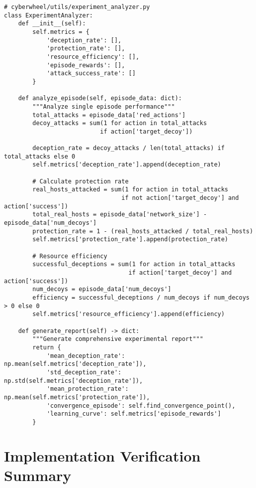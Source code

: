 \documentclass[12pt,a4paper]{article}
\begin{document}
\begin{lstlisting}[caption=Experimental Analysis Implementation]
# cyberwheel/utils/experiment_analyzer.py
class ExperimentAnalyzer:
    def __init__(self):
        self.metrics = {
            'deception_rate': [],
            'protection_rate': [],
            'resource_efficiency': [],
            'episode_rewards': [],
            'attack_success_rate': []
        }
    
    def analyze_episode(self, episode_data: dict):
        """Analyze single episode performance"""
        total_attacks = episode_data['red_actions']
        decoy_attacks = sum(1 for action in total_attacks 
                           if action['target_decoy'])
        
        deception_rate = decoy_attacks / len(total_attacks) if total_attacks else 0
        self.metrics['deception_rate'].append(deception_rate)
        
        # Calculate protection rate
        real_hosts_attacked = sum(1 for action in total_attacks 
                                 if not action['target_decoy'] and action['success'])
        total_real_hosts = episode_data['network_size'] - episode_data['num_decoys']
        protection_rate = 1 - (real_hosts_attacked / total_real_hosts)
        self.metrics['protection_rate'].append(protection_rate)
        
        # Resource efficiency
        successful_deceptions = sum(1 for action in total_attacks 
                                   if action['target_decoy'] and action['success'])
        num_decoys = episode_data['num_decoys']
        efficiency = successful_deceptions / num_decoys if num_decoys > 0 else 0
        self.metrics['resource_efficiency'].append(efficiency)
    
    def generate_report(self) -> dict:
        """Generate comprehensive experimental report"""
        return {
            'mean_deception_rate': np.mean(self.metrics['deception_rate']),
            'std_deception_rate': np.std(self.metrics['deception_rate']),
            'mean_protection_rate': np.mean(self.metrics['protection_rate']),
            'convergence_episode': self.find_convergence_point(),
            'learning_curve': self.metrics['episode_rewards']
        }
\end{lstlisting}

\section{Implementation Verification Summary}
\end{document}
